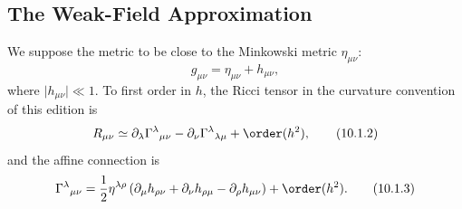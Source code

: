 
\subsection{The Weak-Field Approximation}\label{sec:10.1}

We suppose the metric to be close to the Minkowski metric
\(\eta_{\mu\nu}\):
\begin{equation}
  g_{\mu\nu}=\eta_{\mu\nu}+h_{\mu\nu},
  \tag{10.1.1}\label{eq:10.1.1}
\end{equation}
where \(\lvert h_{\mu\nu}\rvert\ll1\). To first order in \(h\), the Ricci
tensor in the curvature convention of this edition is
\begin{equation}
  R_{\mu\nu}
  \simeq
  \partial_\lambda\Gamma^\lambda{}_{\mu\nu}
  -\partial_\nu\Gamma^\lambda{}_{\lambda\mu}
  +\order(h^2),
  \tag{10.1.2}\label{eq:10.1.2}
\end{equation}
and the affine connection is
\begin{equation}
  \Gamma^\lambda{}_{\mu\nu}
  =
  \frac12\eta^{\lambda\rho}
  \left(
    \partial_\mu h_{\rho\nu}
    +\partial_\nu h_{\rho\mu}
    -\partial_\rho h_{\mu\nu}
  \right)
  +\order(h^2).
  \tag{10.1.3}\label{eq:10.1.3}
\end{equation}

